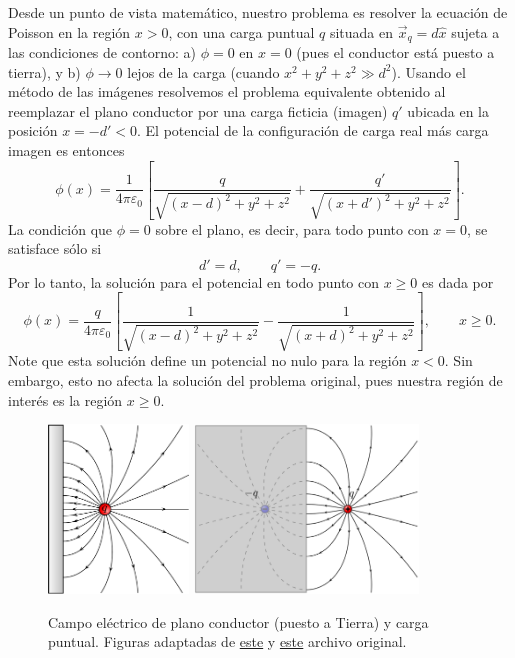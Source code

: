 Desde un punto de vista matemático, nuestro problema es resolver la ecuación de Poisson en la región $x>0$, con una carga puntual $q$ situada en $\vec{x}_q=d\hat{x}$ sujeta a las condiciones de contorno: a) $\phi = 0 $ en $x=0$ (pues el conductor está puesto a tierra), y b) $\phi\rightarrow 0$ lejos de la carga (cuando $x^2 + y^2 + z^2 \gg d^2$). Usando el método de las imágenes resolvemos el problema equivalente obtenido al reemplazar el plano conductor por una carga ficticia (imagen) $q'$ ubicada en la posición $x=-d'<0$. El potencial de la configuración de carga real más carga imagen es entonces
\begin{equation}
 \phi(x)=\frac{1}{4\pi\varepsilon_0}\left[\frac{q}{\sqrt{(x-d)^2+y^2+z^2}}+\frac
{q'}{\sqrt{(x+d')^2+y^2+z^2}}\right].
\end{equation}
La condición que $\phi=0$ sobre el plano, es decir, para todo punto con $x=0$,
se satisface sólo si
\begin{equation}
 d'=d, \qquad q'=-q.
\end{equation}
Por lo tanto, la solución para el potencial en todo punto con $x\ge 0$ es dada por
\begin{equation}\label{phicpplano}
 \phi(x)=\frac{q}{4\pi\varepsilon_0}\left[\frac{1}{\sqrt{(x-d)^2+y^2+z^2}}-\frac
{1}{\sqrt{(x+d)^2+y^2+z^2}}\right], \qquad x\ge 0.
\end{equation}
Note que esta solución define un potencial no nulo para la región $x < 0$. Sin embargo, esto no afecta la solución del problema original, pues nuestra región de interés es la región $x \ge 0$.
\begin{center}
\begin{figure}[H]
\centerline{\includegraphics[height=4.5cm]{fig/fig-metodo-imagen-plano-01.pdf}
\hspace{2cm}
\includegraphics[height=4.5cm]{fig/fig-metodo-imagen-plano-02.pdf}}
\caption{Campo eléctrico de plano conductor (puesto a Tierra) y carga puntual. 
Figuras adaptadas de  \href{http://commons.wikimedia.org/wiki/File:VFPt_image_charge_plane_horizontal.svg}{este} y \href{http://commons.wikimedia.org/wiki/File:VFPt_image_charge_plane.svg}{este} archivo original.}
\label{fig:pyc}
\end{figure}
\end{center}
